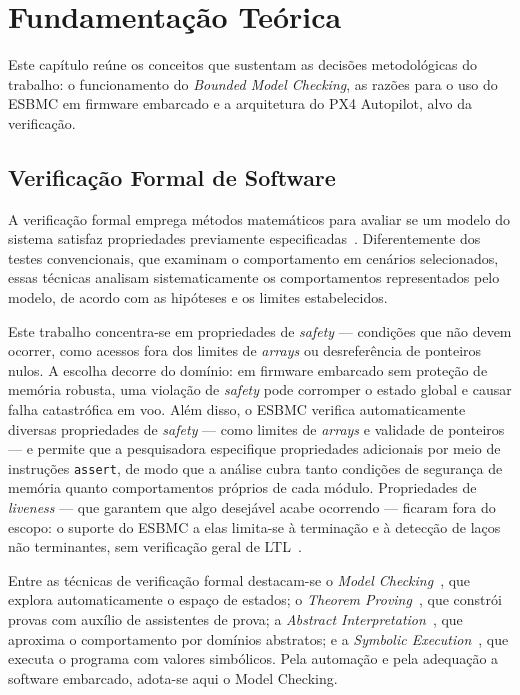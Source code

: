\chapter{Fundamentação Teórica}
\label{cap:fundamentacao}

Este capítulo reúne os conceitos que sustentam as decisões metodológicas do
trabalho: o funcionamento do \textit{Bounded Model Checking}, as razões para o
uso do ESBMC em firmware embarcado e a arquitetura do PX4 Autopilot, alvo da
verificação.

\section{Verificação Formal de Software}

A verificação formal emprega métodos matemáticos para avaliar se um modelo do
sistema satisfaz propriedades previamente especificadas~\cite{Clarke1986}.
Diferentemente dos testes convencionais, que examinam o comportamento em cenários
selecionados, essas técnicas analisam sistematicamente os comportamentos
representados pelo modelo, de acordo com as hipóteses e os limites estabelecidos.

Este trabalho concentra-se em propriedades de \textit{safety} --- condições que
não devem ocorrer, como acessos fora dos limites de \textit{arrays} ou
desreferência de ponteiros nulos. A escolha decorre do domínio: em firmware
embarcado sem proteção de memória robusta, uma violação de \textit{safety} pode
corromper o estado global e causar falha catastrófica em voo. Além disso, o
ESBMC verifica automaticamente diversas propriedades de \textit{safety} --- como
limites de \textit{arrays} e validade de ponteiros --- e permite que a
pesquisadora especifique propriedades adicionais por meio de instruções
\texttt{assert}, de modo que a análise cubra tanto condições de segurança de
memória quanto comportamentos próprios de cada módulo. Propriedades de
\textit{liveness} --- que garantem que algo desejável acabe ocorrendo --- ficaram
fora do escopo: o suporte do ESBMC a elas limita-se à terminação e à detecção de
laços não terminantes, sem verificação geral de LTL~\cite{Menezes2024}.

Entre as técnicas de verificação formal destacam-se o \textit{Model
Checking}~\cite{Clarke1981}, que explora automaticamente o espaço de estados; o
\textit{Theorem Proving}~\cite{Huth2004,Tang2025}, que constrói provas com auxílio de
assistentes de prova; a \textit{Abstract Interpretation}~\cite{Cousot1977}, que
aproxima o comportamento por domínios abstratos; e a \textit{Symbolic
Execution}~\cite{King1976}, que executa o programa com valores simbólicos. Pela
automação e pela adequação a software embarcado, adota-se aqui o Model Checking.

